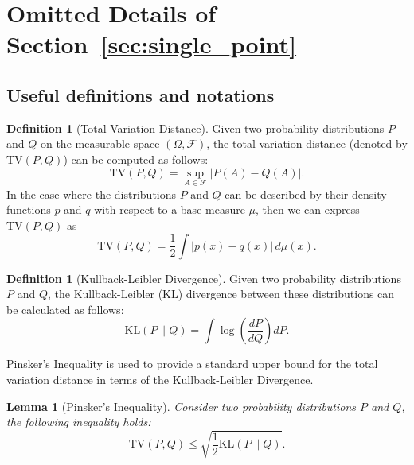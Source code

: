 \documentclass[journal,onecolumn]{IEEEtran}
\theoremstyle{plain}
\newtheorem{lemma}[theorem]{Lemma}
\theoremstyle{definition}
\newtheorem{definition}[theorem]{Definition}
\theoremstyle{remark}
\begin{document}
{\section{Omitted Details of Section~\ref{sec:single_point}}\label{app:single_point}

\subsection{Useful definitions and notations}


\begin{definition}[Total Variation Distance]
\label{def:tv}
Given two probability distributions $P$ and $Q$ on the measurable space $ (\Omega,\mathcal{F})$, the total variation distance (denoted by $\mathrm{TV}(P,Q)$) can be computed as follows:
\begin{equation*}
    \mathrm{TV}(P, Q) = \sup_{A \in \mathcal{F}} |P(A) - Q(A)|.
\end{equation*}
In the case where the distributions $P$ and $Q$ can be described by their density functions $p$ and $q$ with respect to a base measure $\mu$, then we can express $\mathrm{TV}(P,Q)$ as
\begin{equation*}
    \mathrm{TV}(P, Q) = \frac{1}{2} \int |p(x) - q(x)| \, d\mu(x).
\end{equation*}
\end{definition}

\begin{definition}[Kullback-Leibler Divergence]
\label{def:kl}
Given two probability distributions $P$ and $Q$, the Kullback-Leibler (KL) divergence between these distributions can be calculated as follows:
\begin{equation*}
    \mathrm{KL}(P \| Q) = \int \log\left(\frac{dP}{dQ}\right) dP.
\end{equation*}
\end{definition}

Pinsker's Inequality is used to provide a standard upper bound for the total variation distance in terms of the Kullback-Leibler Divergence.

\begin{lemma}[Pinsker's Inequality]
\label{lem:pinsker}
Consider two probability distributions $P$ and $Q$, the following inequality holds:
\begin{equation*}
    \mathrm{TV}(P, Q) \le \sqrt{\frac{1}{2} \mathrm{KL}(P \| Q)}.
\end{equation*}
\end{lemma}

}
\end{document}
